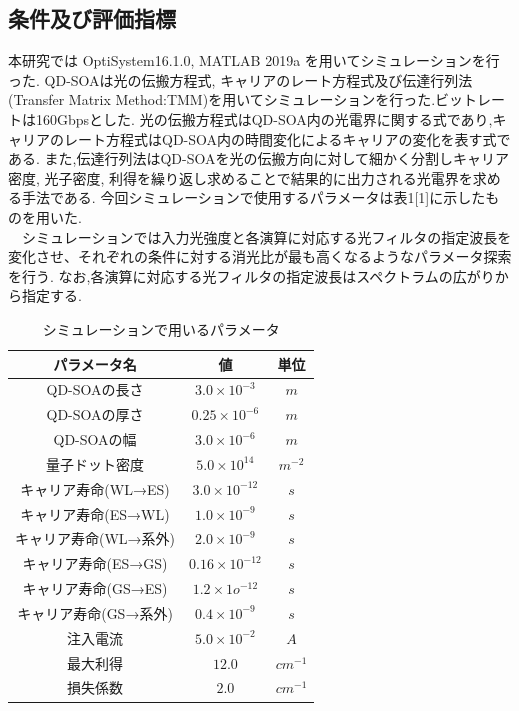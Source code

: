 \documentclass[dvipdfmx]{ujarticle}
\begin{document}
  \subsection{条件及び評価指標}
    本研究では OptiSystem16.1.0, MATLAB 2019a を用いてシミュレーションを行った.
    QD-SOAは光の伝搬方程式, キャリアのレート方程式及び伝達行列法(Transfer Matrix Method:TMM)を用いてシミュレーションを行った.ビットレートは160Gbpsとした.
    光の伝搬方程式はQD-SOA内の光電界に関する式であり,キャリアのレート方程式はQD-SOA内の時間変化によるキャリアの変化を表す式である.
    また,伝達行列法はQD-SOAを光の伝搬方向に対して細かく分割しキャリア密度, 光子密度, 利得を繰り返し求めることで結果的に出力される光電界を求める手法である.
    今回シミュレーションで使用するパラメータは表1[1]に示したものを用いた.\\
    　シミュレーションでは入力光強度と各演算に対応する光フィルタの指定波長を変化させ、それぞれの条件に対する消光比が最も高くなるようなパラメータ探索を行う.
    なお,各演算に対応する光フィルタの指定波長はスペクトラムの広がりから指定する.
    \begin{table}[H]
      \caption{シミュレーションで用いるパラメータ}
      \centering
        \begin{tabular}{ccc}
          \hline
          パラメータ名 & 値 & 単位 \\
          \hline
          QD-SOAの長さ & $ 3.0 \times 10^{-3} $ & $m$\\
          QD-SOAの厚さ & $ 0.25 \times 10^{-6} $ & $m$\\
          QD-SOAの幅 & $ 3.0 \times 10^{-6} $ & $m$\\
          量子ドット密度 & $ 5.0 \times 10^{14} $ & $m^{-2}$\\
          キャリア寿命(WL→ES) & $ 3.0 \times 10^{-12} $ & $s$ \\
          キャリア寿命(ES→WL) & $ 1.0 \times 10^{-9} $ & $s$\\
          キャリア寿命(WL→系外) & $ 2.0 \times 10^{-9} $ & $s$\\
          キャリア寿命(ES→GS) & $ 0.16 \times 10^{-12} $ & $s$\\
          キャリア寿命(GS→ES) & $ 1.2 \times 1o^{-12} $ & $s$\\
          キャリア寿命(GS→系外) & $ 0.4 \times 10^{-9} $ & $s$\\
          注入電流 & $5.0 \times 10^{-2}  $ & $A$\\
          最大利得 & $12.0 $ & $cm^{-1}$\\
          損失係数 & $2.0$ & $cm^{-1}$\\
          \hline
        \end{tabular}
    \end{table}
\end{document}
